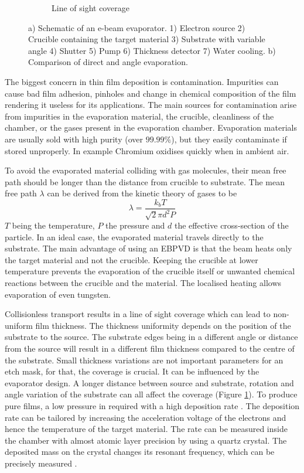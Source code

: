\documentclass[final]{jyflluk}
\begin{document}
\begin{figure}[h]
\begin{subfigure}{0.35\textwidth}
        \caption{Line of sight coverage} \label{fig:angle_evap}
    \end{subfigure}
    \caption{a) Schematic of an e-beam evaporator. 1) Electron source 2) Crucible containing the target material 3) Substrate with variable angle 4) Shutter 5) Pump 6) Thickness detector 7) Water cooling. b) Comparison of direct and angle evaporation. } \label{fig:evap}
\end{figure}



The biggest concern in thin film deposition is contamination. Impurities can cause bad film adhesion, pinholes and change in chemical composition of the film rendering it useless for its applications. The main sources for contamination arise from impurities in the evaporation material, the crucible, cleanliness of the chamber, or the gases present in the evaporation chamber. Evaporation materials are usually sold with high purity (over $99.99 \percent$), but they easily contaminate if stored unproperly. In example Chromium oxidises quickly when in ambient air. 

To avoid the evaporated material colliding with gas molecules, their mean free path should be longer than the distance from crucible to substrate. The mean free path $\lambda$ can be derived from the kinetic theory of gases to be 
%
\begin{equation}
    \label{eq:mean_free}
    \lambda = \frac{k_b T}{\sqrt{2}\pi d^2 P}
 \end{equation}
$T$ being the temperature, $P$ the pressure and $d$ the effective cross-section of the particle. In an ideal case, the evaporated material travels directly to the substrate. The main advantage of using an EBPVD is that the beam heats only the target material and not the crucible. Keeping the crucible at lower temperature prevents the evaporation of the crucible itself or unwanted chemical reactions between the crucible and the material. The localised heating allows evaporation of even tungsten. \cite{franssila2010introduction}

Collisionless transport results in a line of sight coverage which can lead to non-uniform film thickness. The thickness uniformity depends on the position of the substrate to the source. The substrate edges being in a different angle or distance from the source will result in a different film thickness compared to the centre of the substrate. Small thickness variations are not important parameters for an etch mask, for that, the coverage is crucial. It can be influenced by the evaporator design. A longer distance between source and substrate, rotation and angle variation of the substrate can all affect the coverage (Figure \ref{fig:angle_evap}).
To produce pure films, a low pressure in required with a high deposition rate \cite{ohring1992materials}. The deposition rate can be tailored by increasing the acceleration voltage of the electrons and hence the temperature of the target material. The rate can be measured inside the chamber with almost atomic layer precision by using a quartz crystal. The deposited mass on the crystal changes its resonant frequency, which can be precisely measured \cite{franssila2010introduction}. 
\end{document}
